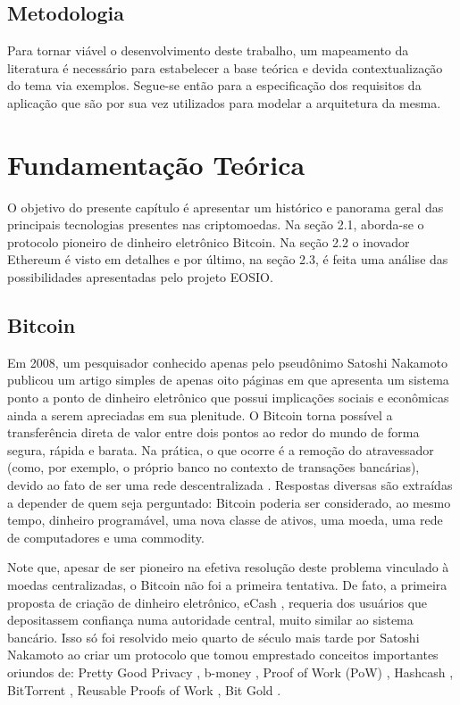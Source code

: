 \documentclass[a4paper,12pt]{monografia}
\theoremstyle{plain}
\theoremstyle{definition}
\theoremstyle{remark}
\begin{document}
\section{Metodologia}
Para tornar vi\'{a}vel o desenvolvimento deste trabalho, um mapeamento da literatura \'{e} necess\'{a}rio para estabelecer a base te\'{o}rica e devida contextualiza\c{c}\~{a}o do tema via exemplos.
Segue-se ent\~{a}o para a especifica\c{c}\~{a}o dos requisitos da aplica\c{c}\~{a}o que s\~{a}o por sua vez utilizados para modelar a arquitetura da mesma.

\chapter{Fundamenta\c{c}\~ao Te\'orica}

O objetivo do presente cap\'itulo \'e apresentar um hist\'orico e panorama geral das principais tecnologias presentes nas criptomoedas.
Na se\c{c}\~{a}o 2.1, aborda-se o protocolo pioneiro de dinheiro eletr\^{o}nico Bitcoin.
Na se\c{c}\~{a}o 2.2 o inovador Ethereum \'e visto em detalhes e por \'{u}ltimo, na se\c{c}\~{a}o 2.3, \'e feita uma an\'alise das possibilidades apresentadas pelo projeto EOSIO.

\section{Bitcoin}

Em 2008, um pesquisador conhecido apenas pelo pseud\^onimo Satoshi Nakamoto publicou um artigo simples de apenas oito p\'aginas em que apresenta um sistema ponto a ponto de dinheiro eletr\^onico que possui implica\c{c}\~oes sociais e econ\^omicas ainda a serem apreciadas em sua plenitude.
O Bitcoin torna poss\'{i}vel a transfer\^{e}ncia direta de valor entre dois pontos ao redor do mundo de forma segura, r\'{a}pida e barata.
Na pr\'{a}tica, o que ocorre \'{e} a remo\c{c}\~{a}o do atravessador (como, por exemplo, o pr\'{o}prio banco no contexto de transa\c{c}\~{o}es banc\'{a}rias), devido ao fato de ser uma rede descentralizada \cite{bitcoin}.
Respostas diversas s\~ao extra\'idas a depender de quem seja perguntado: Bitcoin poderia ser considerado, ao mesmo tempo, dinheiro program\'avel, uma nova classe de ativos, uma moeda, uma rede de computadores e uma commodity.

Note que, apesar de ser pioneiro na efetiva resolu\c{c}\~{a}o deste problema vinculado \`{a} moedas centralizadas, o Bitcoin n\~{a}o foi a primeira tentativa.
De fato, a primeira proposta de cria\c{c}\~ao de dinheiro eletr\^{o}nico, eCash \cite{ecash}, requeria dos usu\'arios que depositassem confian\c{c}a numa autoridade central, muito similar ao sistema banc\'ario.
Isso s\'o foi resolvido meio quarto de s\'eculo mais tarde por Satoshi Nakamoto ao criar um protocolo que tomou emprestado conceitos importantes oriundos de: Pretty Good Privacy \cite{pgp}, b-money \cite{b-money}, Proof of Work (PoW) \cite{pow}, Hashcash \cite{hashcash}, BitTorrent \cite{bittorrent}, Reusable Proofs of Work \cite{rpow}, Bit Gold \cite{bitgold}.
\end{document}
